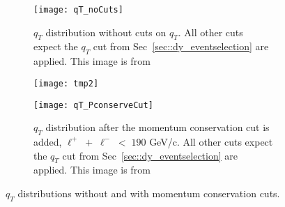 \begin{figure}[h!t]
  \centering
  \begin{subfigure}{.46\textwidth}
    \centering \texttt{[image: qT\_noCuts]}
    \caption{$q_T$ distribution without cuts on $q_T$.  All other cuts expect
      the $q_T$ cut from Sec~\ref{sec::dy_eventselection} are applied.  This
      image is from~\cite{janthesis}}
    \label{fig::qT_noCuts}
  \end{subfigure}%
  \begin{subfigure}{.02\textwidth}
    \centering
    \texttt{[image: tmp2]}
    \label{fig::tmp2}%
  \end{subfigure}
  \begin{subfigure}{.46\textwidth}
    \centering \texttt{[image: qT\_PconserveCut]}
    \caption{$q_T$ distribution after the momentum conservation cut is added,
      $\ell^+ \; + \; \ell^- \; < \; 190$ GeV/c.  All other cuts expect the
      $q_T$ cut from Sec~\ref{sec::dy_eventselection} are applied.  This image
      is from~\cite{janthesis}}
    \label{fig::qT_PconserveCut}
  \end{subfigure}
  \caption{$q_T$ distributions without and with momentum conservation cuts.}
\end{figure}

